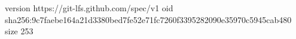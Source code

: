 version https://git-lfs.github.com/spec/v1
oid sha256:9c7faebe164a21d3380bed7fe52e71fc7260f3395282090e35970c5945cab480
size 253
